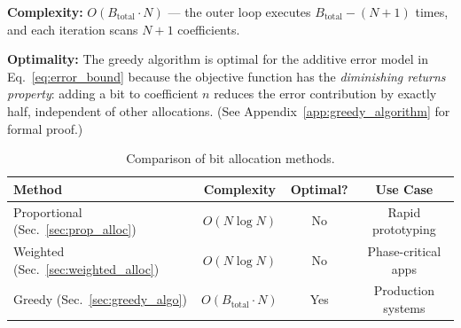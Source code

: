\medskip
\noindent{}
\medskip

\textbf{Complexity:} $O(B_{\text{total}} \cdot N)$ — the outer loop executes $B_{\text{total}} - (N+1)$ times, and each iteration scans $N+1$ coefficients.

\textbf{Optimality:} The greedy algorithm is optimal for the additive error model in Eq.~\eqref{eq:error_bound} because the objective function has the \emph{diminishing returns property}: adding a bit to coefficient $n$ reduces the error contribution by exactly half, independent of other allocations. (See Appendix~\ref{app:greedy_algorithm} for formal proof.)

\begin{table}[h]
\centering
\begin{tabular}{lccc}
\toprule
\textbf{Method} & \textbf{Complexity} & \textbf{Optimal?} & \textbf{Use Case} \\
\midrule
Proportional (Sec.~\ref{sec:prop_alloc}) & $O(N \log N)$ & No & Rapid prototyping \\
Weighted (Sec.~\ref{sec:weighted_alloc}) & $O(N \log N)$ & No & Phase-critical apps \\
Greedy (Sec.~\ref{sec:greedy_algo}) & $O(B_{\text{total}} \cdot N)$ & Yes & Production systems \\
\bottomrule
\end{tabular}
\caption{Comparison of bit allocation methods.}
\label{tab:bit_alloc_comparison}
\end{table}

